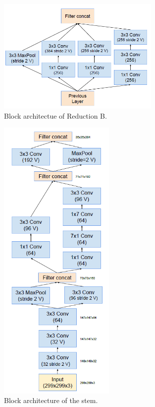 \documentclass[a4paper,12pt,oneside]{book}
\begin{document}
\begin{figure}[!hbtp]
\centering
\includegraphics[width=0.7\textwidth]{Figures/reduction_B.png}
\captionsetup{font=small}
\caption{Block architectue of Reduction B.}
\label{fig:redA}
\end{figure}
\newpage

\begin{figure}[!hbtp]
\centering
\includegraphics[width=0.5\textwidth]{Figures/stem_block.png}
\captionsetup{font=small}
\vspace{5pt}
\caption{Block architecture of the stem.}
\label{fig:redA}
\end{figure}
\end{document}
